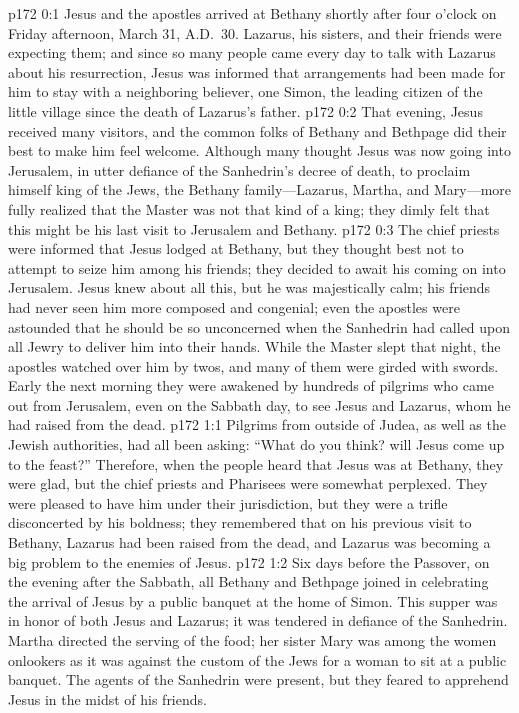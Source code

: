 \author{Midwayer Commission}
\vs p172 0:1 Jesus and the apostles arrived at Bethany shortly after four o’clock on Friday afternoon, March 31, A.D.~30. Lazarus, his sisters, and their friends were expecting them; and since so many people came every day to talk with Lazarus about his resurrection, Jesus was informed that arrangements had been made for him to stay with a neighboring believer, one Simon, the leading citizen of the little village since the death of Lazarus’s father.
\vs p172 0:2 That evening, Jesus received many visitors, and the common folks of Bethany and Bethpage did their best to make him feel welcome. Although many thought Jesus was now going into Jerusalem, in utter defiance of the Sanhedrin’s decree of death, to proclaim himself king of the Jews, the Bethany family---Lazarus, Martha, and Mary---more fully realized that the Master was not that kind of a king; they dimly felt that this might be his last visit to Jerusalem and Bethany.
\vs p172 0:3 The chief priests were informed that Jesus lodged at Bethany, but they thought best not to attempt to seize him among his friends; they decided to await his coming on into Jerusalem. Jesus knew about all this, but he was majestically calm; his friends had never seen him more composed and congenial; even the apostles were astounded that he should be so unconcerned when the Sanhedrin had called upon all Jewry to deliver him into their hands. While the Master slept that night, the apostles watched over him by twos, and many of them were girded with swords. Early the next morning they were awakened by hundreds of pilgrims who came out from Jerusalem, even on the Sabbath day, to see Jesus and Lazarus, whom he had raised from the dead.
\vs p172 1:1 Pilgrims from outside of Judea, as well as the Jewish authorities, had all been asking: “What do you think? will Jesus come up to the feast?” Therefore, when the people heard that Jesus was at Bethany, they were glad, but the chief priests and Pharisees were somewhat perplexed. They were pleased to have him under their jurisdiction, but they were a trifle disconcerted by his boldness; they remembered that on his previous visit to Bethany, Lazarus had been raised from the dead, and Lazarus was becoming a big problem to the enemies of Jesus.
\vs p172 1:2 Six days before the Passover, on the evening after the Sabbath, all Bethany and Bethpage joined in celebrating the arrival of Jesus by a public banquet at the home of Simon. This supper was in honor of both Jesus and Lazarus; it was tendered in defiance of the Sanhedrin. Martha directed the serving of the food; her sister Mary was among the women onlookers as it was against the custom of the Jews for a woman to sit at a public banquet. The agents of the Sanhedrin were present, but they feared to apprehend Jesus in the midst of his friends.
